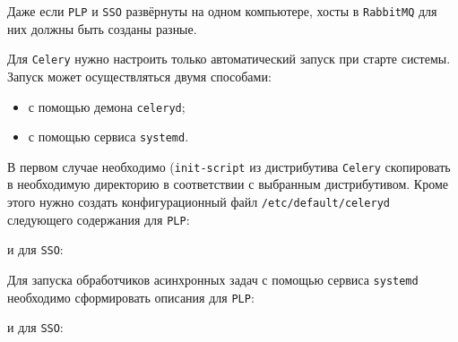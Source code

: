 Даже если \texttt{PLP} и \texttt{SSO} развёрнуты на одном компьютере, хосты в \texttt{RabbitMQ} для них должны быть созданы разные.

Для \texttt{Celery} нужно настроить только автоматический запуск при старте системы. Запуск может осуществляться двумя способами: 
\begin{itemize}
	\item с помощью демона \texttt{celeryd};
	\item с помощью сервиса \texttt{systemd}.
\end{itemize}
В первом случае необходимо (\texttt{init-script} из дистрибутива \texttt{Celery} скопировать в необходимую директорию в соответствии с выбранным дистрибутивом. Кроме этого нужно создать конфигурационный файл \texttt{/etc/default/celeryd} следующего содержания
для \texttt{PLP}:

и для \texttt{SSO}:

Для запуска обработчиков асинхронных задач с помощью сервиса \texttt{systemd} необходимо сформировать описания для \texttt{PLP}:

и для \texttt{SSO}:


